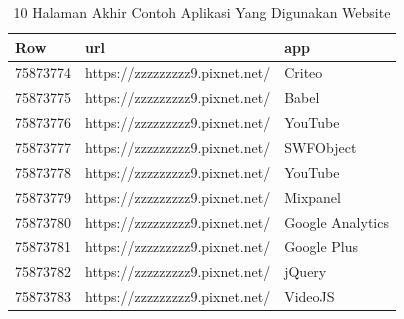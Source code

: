 \begin{table}[H]
	\centering
	\begin{tabular}{|l|l|l|}
		\hline
		\textbf{Row} & \textbf{url} & \textbf{app}\\
		\hline
		75873774 & https://zzzzzzzzz9.pixnet.net/
		 & Criteo\\
		\hline
		75873775 &https://zzzzzzzzz9.pixnet.net/
		 & Babel\\
		\hline
		75873776 &https://zzzzzzzzz9.pixnet.net/
		 & YouTube\\
		\hline
		75873777 & https://zzzzzzzzz9.pixnet.net/
		 & SWFObject
		 \\
		\hline
		75873778 & https://zzzzzzzzz9.pixnet.net/
		 & YouTube\\
		\hline
		75873779 & https://zzzzzzzzz9.pixnet.net/
		 & Mixpanel\\
		\hline
		75873780 & 	
		https://zzzzzzzzz9.pixnet.net/
		  & 	
		Google Analytics
		 \\
		\hline
		75873781 & 	
		https://zzzzzzzzz9.pixnet.net/
		  & Google Plus
		  \\
		\hline
		75873782 & 	
		https://zzzzzzzzz9.pixnet.net/
		  & jQuery\\
		\hline
		75873783 & 	
		https://zzzzzzzzz9.pixnet.net/
	  & VideoJS\\
		\hline
	\end{tabular}
	\caption{10 Halaman Akhir Contoh Aplikasi Yang Digunakan Website}
	\label{table:contoh_langkah422}
\end{table}

